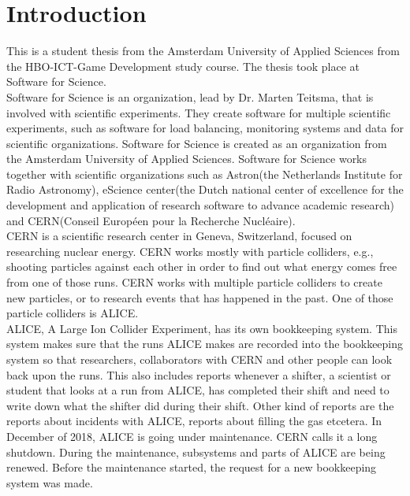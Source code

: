 \documentclass[paper=a4, fontsize=11pt,twoside]{scrartcl}	%
\begin{document}
\section{Introduction}
This is a student thesis from the Amsterdam University of Applied Sciences from the HBO-ICT-Game Development study course. The thesis took place at Software for Science. \\
Software for Science is an organization, lead by Dr. Marten Teitsma, that is involved with scientific experiments. They create software for multiple scientific experiments, such as software for load balancing, monitoring systems and data for scientific organizations. Software for Science is created as an organization from the Amsterdam University of Applied Sciences. Software for Science works together with scientific organizations such as Astron(the Netherlands Institute for Radio Astronomy), eScience center(the Dutch national center of excellence for the development and application of research software to advance academic research) and CERN(Conseil Européen pour la Recherche Nucléaire). \\
CERN is a scientific research center in Geneva, Switzerland, focused on researching nuclear energy. CERN works mostly with particle colliders, e.g., shooting particles against each other in order to find out what energy comes free from one of those runs. CERN works with multiple particle colliders to create new particles, or to research events that has happened in the past. One of those particle colliders is ALICE. \\
ALICE, A Large Ion Collider Experiment, has its own bookkeeping system. This system makes sure that the runs ALICE makes are recorded into the bookkeeping system so that researchers, collaborators with CERN and other people can look back upon the runs. This also includes reports whenever a shifter, a scientist or student that looks at a run from ALICE, has completed their shift and need to write down what the shifter did during their shift. Other kind of reports are the reports about incidents with ALICE, reports about filling the gas etcetera. In December of 2018, ALICE is going under maintenance. CERN calls it a long shutdown. During the maintenance, subsystems and parts of ALICE are being renewed. Before the maintenance started, the request for a new bookkeeping system was made. \\

\newpage
\end{document}
